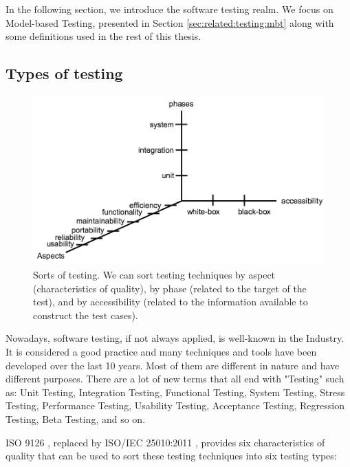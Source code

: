In the following section, we introduce the software testing
realm. We focus on Model-based Testing, presented in Section
\ref{sec:related:testing:mbt} along with some definitions used
in the rest of this thesis.

\subsection{Types of testing}

\begin{figure}[ht]
    \begin{center}
    \includegraphics[width=1.0\linewidth]{figures/sorts-of-testing.png}
    \end{center}

    \caption{Sorts of testing. We can sort testing techniques by
    aspect (characteristics of quality), by phase (related to the
    target of the test), and by accessibility (related to the
    information available to construct the test cases).}
\end{figure}

Nowadays, software testing, if not always applied, is well-known
in the Industry. It is considered a good practice and many
techniques and tools have been developed over the last 10 years.
Most of them are different in nature and have different purposes.
There are a lot of new terms that all end with "Testing" such as:
Unit Testing, Integration Testing, Functional Testing, System
Testing, Stress Testing, Performance Testing, Usability Testing,
Acceptance Testing, Regression Testing, Beta Testing, and so on.

ISO 9126 \cite{iso9126}, replaced by ISO/IEC 25010:2011
\cite{10951538}, provides six characteristics of quality that can
be used to sort these testing techniques into six testing types:

